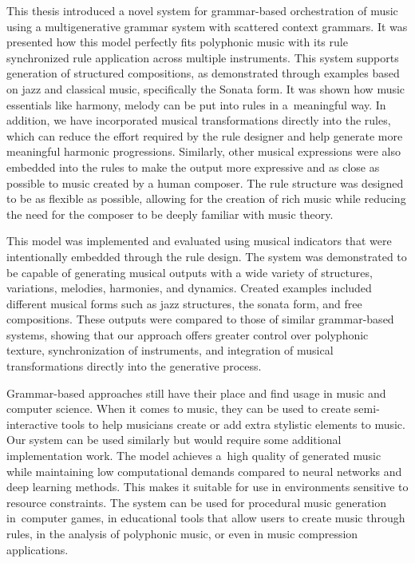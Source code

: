 This thesis introduced a novel system for grammar-based orchestration of music using a multigenerative grammar system with scattered context grammars. It was presented how this model perfectly fits polyphonic music with its rule synchronized rule application across multiple instruments. This system supports generation of structured compositions, as demonstrated through examples based on jazz and classical music, specifically the Sonata form. It was shown how music essentials like harmony, melody can be put into rules in a~meaningful way. In addition, we have incorporated musical transformations directly into the rules, which can reduce the effort required by the rule designer and help generate more meaningful harmonic progressions. Similarly, other musical expressions were also embedded into the rules to make the output more expressive and as close as possible to music created by a human composer. The rule structure was designed to be as flexible as possible, allowing for the creation of rich music while reducing the need for the composer to be deeply familiar with music theory.

This model was implemented and evaluated using musical indicators that were intentionally embedded through the rule design. The system was demonstrated to be capable of generating musical outputs with a wide variety of structures, variations, melodies, harmonies, and dynamics. Created examples included different musical forms such as jazz structures, the sonata form, and free compositions. These outputs were compared to those of similar grammar-based systems, showing that our approach offers greater control over polyphonic texture, synchronization of instruments, and integration of musical transformations directly into the generative process.

Grammar-based approaches still have their place and find usage in music and computer science. When it comes to music, they can be used to create semi-interactive tools to help musicians create or add extra stylistic elements to music. Our system can be used similarly but would require some additional implementation work. The model achieves a~high quality of generated music while maintaining low computational demands compared to neural networks and deep learning methods. This makes it suitable for use in environments sensitive to resource constraints. The system can be used for procedural music generation in~computer games, in educational tools that allow users to create music through rules, in the analysis of polyphonic music, or even in music compression applications.

